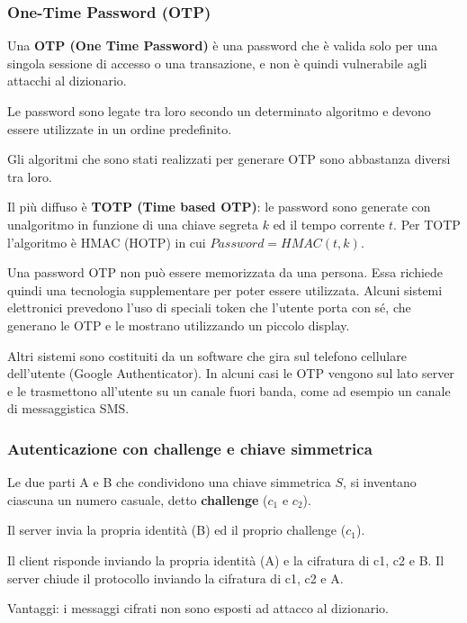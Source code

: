         \subsubsection{One-Time Password (OTP)}
            Una \textbf{OTP (One Time Password)} è una password che è valida solo per una singola sessione di accesso o una transazione, e non è quindi vulnerabile agli attacchi al dizionario.
        
            Le password sono legate tra loro secondo un determinato algoritmo e devono essere utilizzate in un ordine predefinito.
        
            Gli algoritmi che sono stati realizzati per generare OTP sono abbastanza diversi tra loro.
        
            Il più diffuso è \textbf{TOTP (Time based OTP)}: le password sono generate con unalgoritmo in funzione di una chiave segreta $k$ ed il tempo corrente $t$. Per TOTP l'algoritmo è HMAC (HOTP) in cui $Password = HMAC (t,k)$.

            Una password OTP non può essere memorizzata da una persona. Essa richiede quindi una tecnologia supplementare per poter essere utilizzata. Alcuni sistemi elettronici prevedono l'uso di speciali token che l'utente porta con sé, che generano le OTP e le mostrano utilizzando un piccolo display.

            Altri sistemi sono costituiti da un software che gira sul telefono cellulare dell'utente (Google Authenticator). In alcuni casi le OTP vengono sul lato server e le trasmettono all'utente su un canale fuori banda, come ad esempio un canale di messaggistica SMS.
        
        \subsubsection{Autenticazione con challenge e chiave simmetrica}
            Le due parti A e B che condividono una chiave simmetrica $S$, si inventano ciascuna un numero casuale, detto \textbf{challenge} ($c_1$ e $c_2$).
        
            Il server invia la propria identità (B) ed il proprio challenge ($c_1$).
        
            Il client risponde inviando la propria identità (A) e la cifratura di c1, c2 e B. Il server chiude il protocollo inviando la cifratura di c1, c2 e A.
        
            Vantaggi: i messaggi cifrati non sono esposti ad attacco al dizionario.
            
